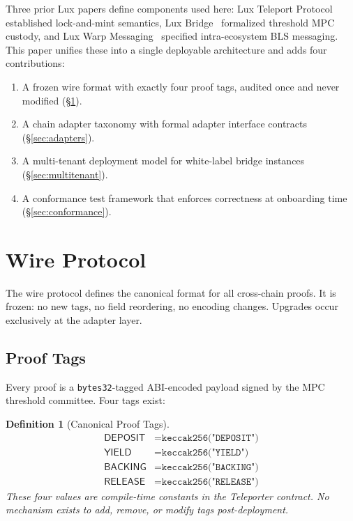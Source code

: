 \documentclass[11pt]{article}
\newtheorem{definition}{Definition}
\begin{document}
Three prior Lux papers define components used here: Lux Teleport Protocol~\cite{luxtp2022} established lock-and-mint semantics, Lux Bridge~\cite{luxbridge2023} formalized threshold MPC custody, and Lux Warp Messaging~\cite{luxwarp2023} specified intra-ecosystem BLS messaging. This paper unifies these into a single deployable architecture and adds four contributions:

\begin{enumerate}[nosep]
  \item A frozen wire format with exactly four proof tags, audited once and never modified (\S\ref{sec:wire}).
  \item A chain adapter taxonomy with formal adapter interface contracts (\S\ref{sec:adapters}).
  \item A multi-tenant deployment model for white-label bridge instances (\S\ref{sec:multitenant}).
  \item A conformance test framework that enforces correctness at onboarding time (\S\ref{sec:conformance}).
\end{enumerate}

\section{Wire Protocol}
\label{sec:wire}

The wire protocol defines the canonical format for all cross-chain proofs. It is frozen: no new tags, no field reordering, no encoding changes. Upgrades occur exclusively at the adapter layer.

\subsection{Proof Tags}

Every proof is a \texttt{bytes32}-tagged ABI-encoded payload signed by the MPC threshold committee. Four tags exist:

\begin{definition}[Canonical Proof Tags]
\label{def:tags}
\begin{align}
  \mathsf{DEPOSIT}  &= \texttt{keccak256("DEPOSIT")}  \label{eq:tag-deposit} \\
  \mathsf{YIELD}    &= \texttt{keccak256("YIELD")}    \label{eq:tag-yield} \\
  \mathsf{BACKING}  &= \texttt{keccak256("BACKING")}  \label{eq:tag-backing} \\
  \mathsf{RELEASE}  &= \texttt{keccak256("RELEASE")}  \label{eq:tag-release}
\end{align}
These four values are compile-time constants in the Teleporter contract. No mechanism exists to add, remove, or modify tags post-deployment.
\end{definition}
\end{document}
